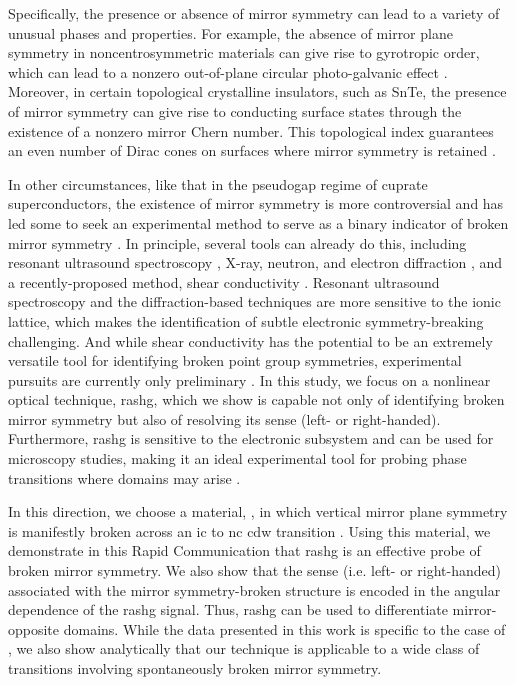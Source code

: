 Specifically, the presence or absence of mirror symmetry can lead to a variety of unusual phases and properties.
For example, the absence of mirror plane symmetry in noncentrosymmetric materials can give rise to gyrotropic order, which can lead to a nonzero out-of-plane circular photo-galvanic effect \citep{belinicher1980}.
Moreover, in certain topological crystalline insulators, such as SnTe, the presence of mirror symmetry can give rise to conducting surface states through the existence of a nonzero mirror Chern number.
This topological index guarantees an even number of Dirac cones on surfaces where mirror symmetry is retained \citep{teo2008, hsieh_topological_2012, fu_topological_2011}.

In other circumstances, like that in the pseudogap regime of cuprate superconductors, the existence of mirror symmetry is more controversial and has led some to seek an experimental method to serve as a binary indicator of broken mirror symmetry \citep{hlobil_elastoconductivity_2015}.
In principle, several tools can already do this, including resonant ultrasound spectroscopy \citep{leisure1997, migliori1993}, X-ray, neutron, and electron diffraction \citep{bacon1966, dorset2013}, and a recently-proposed method, shear conductivity \citep{hlobil_elastoconductivity_2015}.
Resonant ultrasound spectroscopy and the diffraction-based techniques are more sensitive to the ionic lattice, which makes the identification of subtle electronic symmetry-breaking challenging.
And while shear conductivity has the potential to be an extremely versatile tool for identifying broken point group symmetries, experimental pursuits are currently only preliminary \citep{hlobil_elastoconductivity_2015}.
In this study, we focus on a nonlinear optical technique, \gls{rashg}, which we show is capable not only of identifying broken mirror symmetry \citep{heinz_study_1985} but also of resolving its sense (left- or right-handed).
Furthermore, \gls{rashg} is sensitive to the electronic subsystem and can be used for microscopy studies, making it an ideal experimental tool for probing phase transitions where domains may arise \citep{kumar_magnetic_2017, harter_parity-breaking_2017}.

In this direction, we choose a material, \tastwo, in which vertical mirror plane symmetry is manifestly broken across an \gls{ic} to \gls{nc} \gls{cdw} transition \citep{wilson_charge-density_1975, zong_ultrafast_2018}.
Using this material, we demonstrate in this Rapid Communication that \gls{rashg} is an effective probe of broken mirror symmetry.
We also show that the sense (i.e. left- or right-handed) associated with the mirror symmetry-broken structure is encoded in the angular dependence of the \gls{rashg} signal.
Thus, \gls{rashg} can be used to differentiate mirror-opposite domains. 
While the data presented in this work is specific to the case of \tastwo, we also show analytically that our technique is applicable to a wide class of transitions involving spontaneously broken mirror symmetry.


